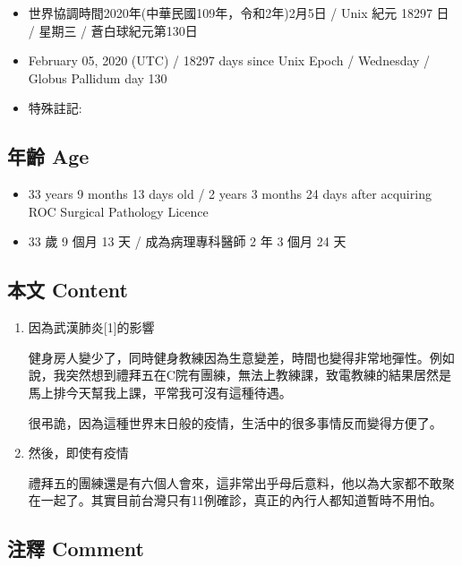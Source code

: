 \documentclass[
]{article}
\providecommand{\tightlist}{%
  \setlength{\itemsep}{0pt}\setlength{\parskip}{0pt}}
\begin{document}
\begin{itemize}
\tightlist
\item
  世界協調時間2020年(中華民國109年，令和2年)2月5日 / Unix 紀元 18297 日
  / 星期三 / 蒼白球紀元第130日
\item
  February 05, 2020 (UTC) / 18297 days since Unix Epoch / Wednesday /
  Globus Pallidum day 130
\item
  特殊註記:
\end{itemize}

\hypertarget{ux5e74ux9f61-age-66}{%
\subsection{年齡 Age}\label{ux5e74ux9f61-age-66}}

\begin{itemize}
\tightlist
\item
  33 years 9 months 13 days old / 2 years 3 months 24 days after
  acquiring ROC Surgical Pathology Licence
\item
  33 歲 9 個月 13 天 / 成為病理專科醫師 2 年 3 個月 24 天
\end{itemize}

\hypertarget{ux672cux6587-content-66}{%
\subsection{本文 Content}\label{ux672cux6587-content-66}}

\begin{enumerate}
\def\labelenumi{\arabic{enumi}.}
\item
  因為武漢肺炎{[}1{]}的影響

  健身房人變少了，同時健身教練因為生意變差，時間也變得非常地彈性。例如說，我突然想到禮拜五在C院有團練，無法上教練課，致電教練的結果居然是馬上排今天幫我上課，平常我可沒有這種待遇。

  很弔詭，因為這種世界末日般的疫情，生活中的很多事情反而變得方便了。
\item
  然後，即使有疫情

  禮拜五的團練還是有六個人會來，這非常出乎母后意料，他以為大家都不敢聚在一起了。其實目前台灣只有11例確診，真正的內行人都知道暫時不用怕。
\end{enumerate}

\hypertarget{ux6ce8ux91cb-comment-65}{%
\subsection{注釋 Comment}\label{ux6ce8ux91cb-comment-65}}
\end{document}
